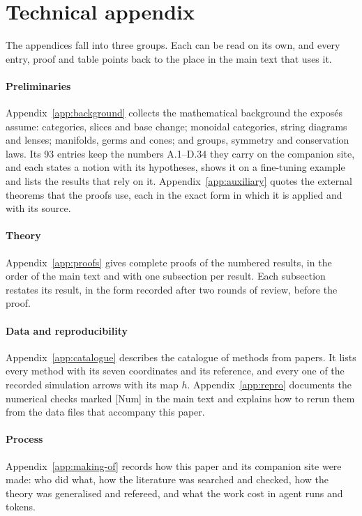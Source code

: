 \section*{\LARGE Technical appendix}

The appendices fall into three groups. Each can be read on its own, and every entry, proof and table points back to the
place in the main text that uses it.

\paragraph{Preliminaries}
Appendix~\ref{app:background} collects the mathematical background the exposés assume: categories, slices and base
change; monoidal categories, string diagrams and lenses; manifolds, germs and cones; and groups, symmetry and
conservation laws. Its 93 entries keep the numbers A.1--D.34 they carry on the companion site, and each states a notion
with its hypotheses, shows it on a fine-tuning example and lists the results that rely on it. Appendix~\ref{app:auxiliary}
quotes the external theorems that the proofs use, each in the exact form in which it is applied and with its source.

\paragraph{Theory}
Appendix~\ref{app:proofs} gives complete proofs of the numbered results, in the order of the main text and with one
subsection per result. Each subsection restates its result, in the form recorded after two rounds of review, before the
proof.

\paragraph{Data and reproducibility}
Appendix~\ref{app:catalogue} describes the catalogue of \nMethods{} methods from \nPapers{} papers. It lists every method
with its seven coordinates and its reference, and every one of the \nArrows{} recorded simulation arrows with its map $h$.
Appendix~\ref{app:repro} documents the numerical checks marked [Num] in the main text and explains how to rerun them from
the data files that accompany this paper.

\paragraph{Process}
Appendix~\ref{app:making-of} records how this paper and its companion site were made: who did what, how the literature was searched and checked, how the theory was generalised and refereed, and what the work cost in agent runs and tokens.
